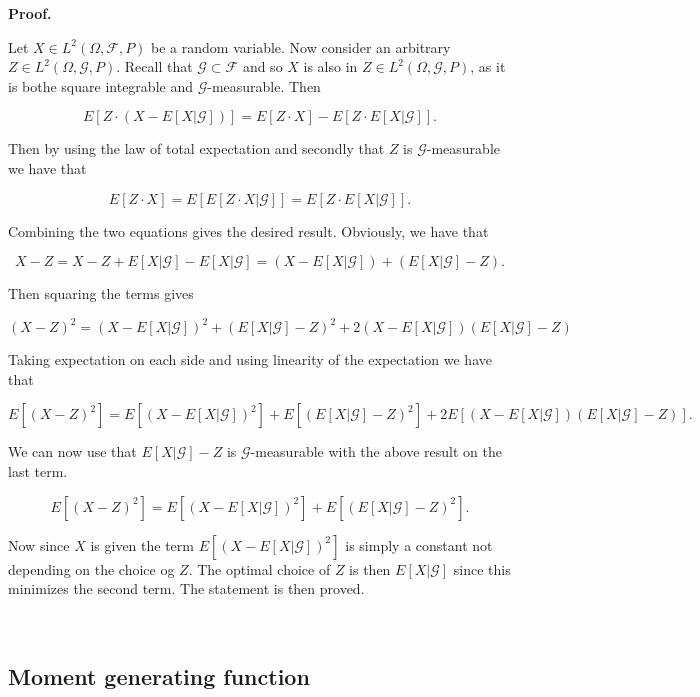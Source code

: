 \documentclass[
]{article}
\begin{document}
\textbf{Proof.}

Let \(X\in L^2(\Omega,\mathcal{F},P)\) be a random variable. Now
consider an arbitrary \(Z\in L^2(\Omega,\mathcal{G},P)\). Recall that
\(\mathcal{G}\subset \mathcal{F}\) and so \(X\) is also in
\(Z\in L^2(\Omega,\mathcal{G},P)\), as it is bothe square integrable and
\(\mathcal{G}\)-measurable. Then

\[E\left[Z\cdot(X-E[X\vert\mathcal{G}])\right]=E\left[Z\cdot X\right]-E\left[Z\cdot E[X\vert\mathcal{G}]\right].\]

Then by using the law of total expectation and secondly that \(Z\) is
\(\mathcal{G}\)-measurable we have that

\[E\left[Z\cdot X\right]=E\left[E[Z\cdot X\vert\mathcal{G}]\right]=E\left[Z\cdot E[ X\vert\mathcal{G}]\right].\]

Combining the two equations gives the desired result. Obviously, we have
that

\[X-Z=X-Z+E[X\vert\mathcal{G}]-E[X\vert\mathcal{G}]=(X-E[X\vert\mathcal{G}])+(E[X\vert\mathcal{G}]-Z).\]

Then squaring the terms gives

\[(X-Z)^2=(X-E[X\vert\mathcal{G}])^2+(E[X\vert\mathcal{G}]-Z)^2+2(X-E[X\vert\mathcal{G}])(E[X\vert\mathcal{G}]-Z)\]

Taking expectation on each side and using linearity of the expectation
we have that

\[E[(X-Z)^2]=E\left[(X-E[X\vert\mathcal{G}])^2\right]+E\left[(E[X\vert\mathcal{G}]-Z)^2\right]+2E\left[(X-E[X\vert\mathcal{G}])(E[X\vert\mathcal{G}]-Z)\right].\]

We can now use that \(E[X\vert\mathcal{G}]-Z\) is
\(\mathcal{G}\)-measurable with the above result on the last term.

\[E[(X-Z)^2]=E\left[(X-E[X\vert\mathcal{G}])^2\right]+E\left[(E[X\vert\mathcal{G}]-Z)^2\right].\]

Now since \(X\) is given the term
\(E\left[(X-E[X\vert\mathcal{G}])^2\right]\) is simply a constant not
depending on the choice og \(Z\). The optimal choice of \(Z\) is then
\(E[X\vert\mathcal{G}]\) since this minimizes the second term. The
statement is then proved.

~

\hypertarget{moment-generating-function}{%
\subsection{Moment generating
function}\label{moment-generating-function}}
\end{document}
